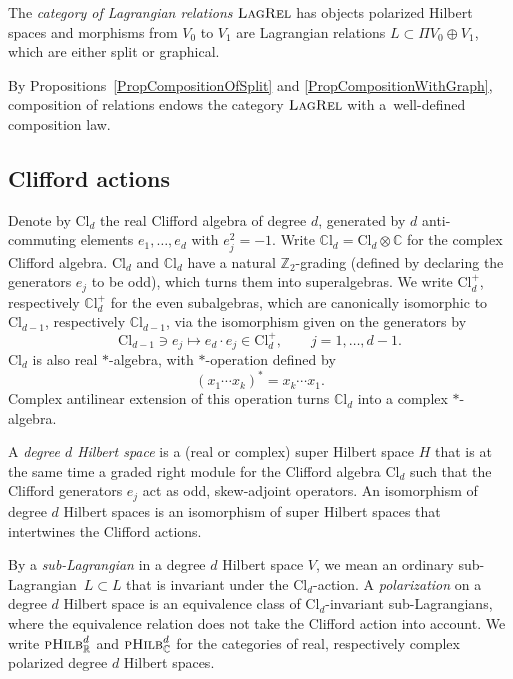 \documentclass[pdftex]{sigma}
\numberwithin{equation}{section}
\newcommand{\LagRel}{\textsc{LagRel}}
\newcommand{\pHilb}{\textsc{pHilb}}
\newcommand{\R}{\mathbb{R}}
\newcommand{\Z}{\mathbb{Z}}
\newcommand{\C}{\mathbb{C}}
\newcommand{\Cl}{\mathrm{Cl}}
\newcommand{\CCl}{\mathbb{C}\mathrm{l}}
\begin{document}
\begin{Definition}
\label{DefinitionCatLagRel}
The \emph{category of Lagrangian relations} $\LagRel$ has objects polarized Hilbert spaces and morphisms from $V_0$ to $V_1$ are Lagrangian relations $L \subset \Pi V_0 \oplus V_1$, which are either split or graphical.
\end{Definition}

By Propositions~\ref{PropCompositionOfSplit} and \ref{PropCompositionWithGraph}, composition of relations endows the category $\LagRel$ with a~well-defined composition law.

\subsection{Clifford actions}

Denote by $\Cl_{d}$ the real Clifford algebra of degree $d$, generated by $d$ anti-commuting elements $e_1, \dots, e_d$ with $e_j^2 = -1$.
Write $\CCl_d = \Cl_d \otimes \C$ for the complex Clifford algebra.
$\Cl_d$ and $\CCl_d$ have a natural $\Z_2$-grading (defined by declaring the generators $e_j$ to be odd), which turns them into superalgebras.
We write $\Cl_d^+$, respectively $\CCl_d^+$ for the even subalgebras, which are canonically isomorphic to $\Cl_{d-1}$, respectively $\CCl_{d-1}$, via the isomorphism given on the generators by
\begin{equation} \label{IsomorphismCliffordDimensionShift}
\Cl_{d-1} \ni e_j \mapsto e_d \cdot e_j \in \Cl_d^+, \qquad j=1, \dots, d-1.
\end{equation}
$\Cl_d$ is also real $*$-algebra, with $*$-operation defined by
\begin{equation*}
 (x_1 \cdots x_k)^* = x_k \cdots x_1.
\end{equation*}
Complex antilinear extension of this operation turns $\CCl_d$ into a complex $*$-algebra.

\begin{Definition}
A \emph{degree $d$ Hilbert space} is a (real or complex) super Hilbert space $H$ that is at the same time a graded right module for the Clifford algebra $\Cl_d$ such that the Clifford generators $e_j$ act as odd, skew-adjoint operators.
An isomorphism of degree $d$ Hilbert spaces is an isomorphism of super Hilbert spaces that intertwines the Clifford actions.
\end{Definition}

By a \emph{sub-Lagrangian} in a degree $d$ Hilbert space $V$, we mean an ordinary sub-Lagrangian~${L \!\subset\! L}$ that is invariant under the $\Cl_d$-action.
A \emph{polarization} on a degree $d$ Hilbert space is an equivalence class of $\Cl_d$-invariant sub-Lagrangians, where the equivalence relation does not take the Clifford action into account.
We write $\pHilb^d_\R$ and $\pHilb^d_\C$ for the categories of real, respectively complex polarized degree $d$ Hilbert spaces.
\end{document}
